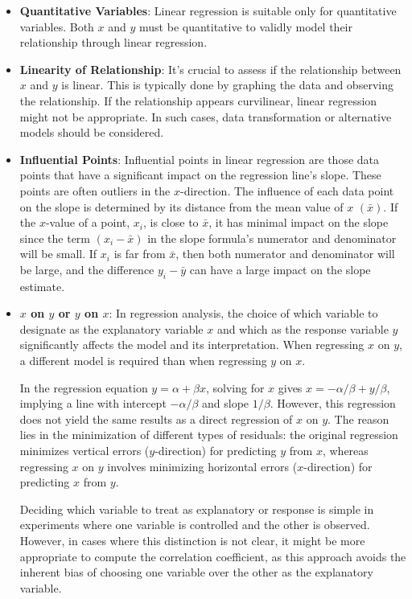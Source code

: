 \documentclass{article}
\begin{document}
\begin{itemize}
    \item \textbf{Quantitative Variables}: Linear regression is suitable only for quantitative variables. Both $x$ and $y$ must be quantitative to validly model their relationship through linear regression.
    \item \textbf{Linearity of Relationship}: It's crucial to assess if the relationship between $x$ and $y$ is linear. This is typically done by graphing the data and observing the relationship. If the relationship appears curvilinear, linear regression might not be appropriate. In such cases, data transformation or alternative models should be considered.
    \item \textbf{Influential Points}: Influential points in linear regression are those data points that have a significant impact on the regression line's slope. These points are often outliers in the $x$-direction. The influence of each data point on the slope is determined by its distance from the mean value of $x$ $(\bar{x})$. If the $x$-value of a point, $x_i$, is close to $\bar{x}$, it has minimal impact on the slope since the term $(x_i - \bar{x})$ in the slope formula's numerator and denominator will be small. If $x_i$ is far from $\bar{x}$, then both numerator and denominator will be large, and the difference $y_i - \bar{y}$ can have a large impact on the slope estimate.
    \item \textbf{$x$ on $y$ or $y$ on $x$}: In regression analysis, the choice of which variable to designate as the explanatory variable $x$ and which as the response variable $y$ significantly affects the model and its interpretation. When regressing $x$ on $y$, a different model is required than when regressing $y$ on $x$.

    In the regression equation $y=\alpha+\beta x$, solving for $x$ gives $x=-\alpha/\beta+y/\beta$, implying a line with intercept $-\alpha/\beta$ and slope $1/\beta$. However, this regression does not yield the same results as a direct regression of $x$ on $y$. The reason lies in the minimization of different types of residuals: the original regression minimizes vertical errors ($y$-direction) for predicting $y$ from $x$, whereas regressing $x$ on $y$ involves minimizing horizontal errors ($x$-direction) for predicting $x$ from $y$.
    
    Deciding which variable to treat as explanatory or response is simple in experiments where one variable is controlled and the other is observed. However, in cases where this distinction is not clear, it might be more appropriate to compute the correlation coefficient, as this approach avoids the inherent bias of choosing one variable over the other as the explanatory variable.
    

\end{itemize}
\end{document}
